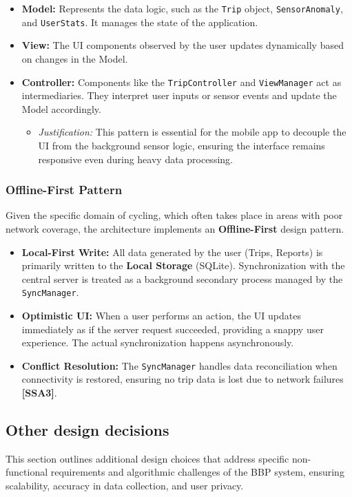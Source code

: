 \begin{itemize}
    \item \textbf{Model:} Represents the data logic, such as the \texttt{Trip} object, \texttt{SensorAnomaly}, and \texttt{UserStats}. It manages the state of the application.
    \item \textbf{View:} The UI components observed by the user updates dynamically based on changes in the Model.
    \item \textbf{Controller:} Components like the \texttt{TripController} and \texttt{ViewManager} act as intermediaries. They interpret user inputs or sensor events and update the Model accordingly.
    \begin{itemize}
        \item \textit{Justification:} This pattern is essential for the mobile app to decouple the UI from the background sensor logic, ensuring the interface remains responsive even during heavy data processing.
    \end{itemize}
\end{itemize}

\subsubsection{Offline-First Pattern}
Given the specific domain of cycling, which often takes place in areas with poor network coverage, the architecture implements an \textbf{Offline-First} design pattern.

\begin{itemize}
    \item \textbf{Local-First Write:} All data generated by the user (Trips, Reports) is primarily written to the \textbf{Local Storage} (SQLite). Synchronization with the central server is treated as a background secondary process managed by the \texttt{SyncManager}.
    \item \textbf{Optimistic UI:} When a user performs an action, the UI updates immediately as if the server request succeeded, providing a snappy user experience. The actual synchronization happens asynchronously.
    \item \textbf{Conflict Resolution:} The \texttt{SyncManager} handles data reconciliation when connectivity is restored, ensuring no trip data is lost due to network failures \textbf{[SSA3]}.
\end{itemize}
\clearpage

\subsection{Other design decisions}
This section outlines additional design choices that address specific non-functional requirements and algorithmic challenges of the BBP system, ensuring scalability, accuracy in data collection, and user privacy.


